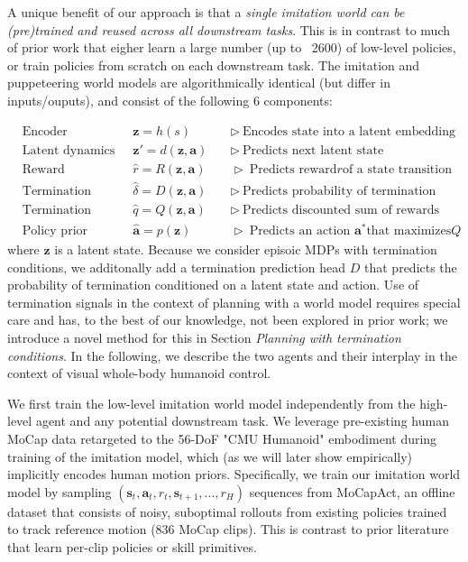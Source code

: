 \documentclass[sn-mathphys-num]{sn-jnl}%
\theoremstyle{thmstyleone}	%
\theoremstyle{thmstyletwo}	%
\theoremstyle{thmstylethree}	%
\begin{document}
A unique benefit of our approach is that a \textit{single imitation world can be (pre)trained and reused across all downstream tasks}.
This is in contrast to much of prior work that eigher learn a large number (up to ~2600) of low-level policies, or train policies from scratch on each downstream task.
The imitation and puppeteering world models are algorithmically identical (but differ in inputs/ouputs), and consist of the following 6 components:

\begin{equation}\label{key}
	\begin{aligned}
		& \text{Encoder} & \mathbf{z} = h(s) &  \quad \triangleright \ \text{Encodes state into a latent embedding} \\
		& \text{Latent dynamics} & \mathbf{z}' = d(\mathbf{z}, \mathbf{a}) & \quad \triangleright \ \text{Predicts next latent state} \\
		& \text{Reward} & \hat{r} = R(\mathbf{z}, \mathbf{a})  & \quad \triangleright \ \text{Predicts reward} r \text{of a state transition} \\
		& \text{Termination} & \hat{\delta} = D(\mathbf{z}, \mathbf{a}) & \quad \triangleright \ \text{Predicts probability of termination} \\
		& \text{Termination value} & \hat{q} = Q(\mathbf{z}, \mathbf{a}) & \quad \triangleright \ \text{Predicts discounted sum of rewards} \\
		& \text{Policy prior} & \hat{\mathbf{a}} = p(\mathbf{z}) & \quad \triangleright \ \text{Predicts an action } \mathbf{a}^* \text{that maximizes} Q
	\end{aligned}
\end{equation}
where $ \mathbf{z} $ is a latent state.
Because we consider episoic MDPs with termination conditions, we additonally add a termination prediction head $ D $ that predicts the probability of termination conditioned on a latent state and action.
Use of termination signals in the context of planning with a world model requires special care and has, to the best of our knowledge, not been explored in prior work;
we introduce a novel method for this in Section \textit{Planning with termination conditions}.
In the following, we describe the two agents and their interplay in the context of visual whole-body humanoid control.


We first train the low-level imitation world model independently from the high-level agent and any potential downstream task.
We leverage pre-existing human MoCap data retargeted to the 56-DoF "CMU Humanoid" embodiment during training of the imitation model, which (as we will later show empirically) implicitly encodes human motion priors.
Specifically, we train our imitation world model by sampling $ (\mathbf{s}_t, \mathbf{a}_t, r_t, \mathbf{s}_{t+1}, ..., r_H) $ sequences from MoCapAct, an offline dataset that consists of noisy, suboptimal rollouts from existing policies trained to track reference motion (836 MoCap clips).
This is contrast to prior literature that learn per-clip policies or skill primitives.
\end{document}
